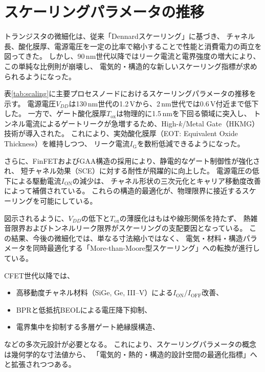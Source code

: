 \section{スケーリングパラメータの推移}
トランジスタの微細化は、従来「Dennardスケーリング」に基づき、  
チャネル長、酸化膜厚、電源電圧を一定の比率で縮小することで性能と消費電力の両立を図ってきた。  
しかし、90\,nm世代以降ではリーク電流と電界強度の増大により、この単純な比例則が崩壊し、  
電気的・構造的な新しいスケーリング指標が求められるようになった。

表\ref{tab:scaling}に主要プロセスノードにおけるスケーリングパラメータの推移を示す。  
電源電圧$V_{DD}$は130\,nm世代の1.2\,Vから、2\,nm世代では0.6\,V付近まで低下した。  
一方で、ゲート酸化膜厚$T_\text{ox}$は物理的に1.5\,nmを下回る領域に突入し、  
トンネル電流によるゲートリークが急増するため、High-$k$/Metal Gate（HKMG）技術が導入された。  
これにより、実効酸化膜厚（EOT: Equivalent Oxide Thickness）を維持しつつ、  
リーク電流$I_\text{G}$を数桁低減できるようになった。

さらに、FinFETおよびGAA構造の採用により、静電的なゲート制御性が強化され、  
短チャネル効果（SCE）に対する耐性が飛躍的に向上した。  
電源電圧の低下による駆動電流$I_\text{ON}$の減少は、  
チャネル形状の三次元化とキャリア移動度改善によって補償されている。  
これらの構造的最適化が、物理限界に接近するスケーリングを可能にしている。



図示されるように、$V_{DD}$の低下と$T_\text{ox}$の薄膜化はもはや線形関係を持たず、  
熱雑音限界およびトンネルリーク限界がスケーリングの支配要因となっている。  
この結果、今後の微細化では、単なる寸法縮小ではなく、  
電気・材料・構造パラメータを同時最適化する「More-than-Moore型スケーリング」への転換が進行している。

CFET世代以降では、  
\begin{itemize}
    \item 高移動度チャネル材料（SiGe, Ge, III–V）による$I_\text{ON}/I_\text{OFF}$改善、  
    \item BPRと低抵抗BEOLによる電圧降下抑制、  
    \item 電界集中を抑制する多層ゲート絶縁膜構造、  
\end{itemize}
などの多次元設計が必要となる。  
これにより、スケーリングパラメータの概念は幾何学的な寸法値から、  
「電気的・熱的・構造的設計空間の最適化指標」へと拡張されつつある。
